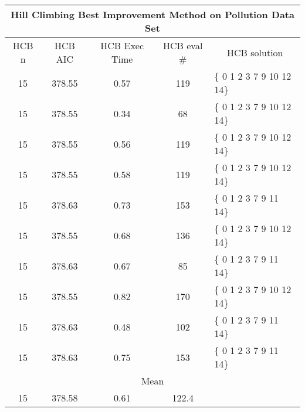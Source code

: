 \begin{tabular}{|c|c|c|c|l|}
	\hline
	\multicolumn{5}{|c|}{Hill Climbing Best Improvement Method on Pollution Data Set}                     \\ \hline
	HCB n & HCB AIC     & HCB Exec Time & HCB eval \# & \multicolumn{1}{c|}{HCB solution} \\ \hline
	15    & 378.55 & 0.57              & 119                    & \{ 0 1 2 3 7 9 10 12 14\}         \\ \hline
	15    & 378.55 & 0.34              & 68                     & \{ 0 1 2 3 7 9 10 12 14\}         \\ \hline
	15    & 378.55 & 0.56              & 119                    & \{ 0 1 2 3 7 9 10 12 14\}         \\ \hline
	15    & 378.55 & 0.58              & 119                    & \{ 0 1 2 3 7 9 10 12 14\}         \\ \hline
	15    & 378.63 & 0.73              & 153                    & \{ 0 1 2 3 7 9 11 14\}            \\ \hline
	15    & 378.55 & 0.68              & 136                    & \{ 0 1 2 3 7 9 10 12 14\}         \\ \hline
	15    & 378.63 & 0.67               & 85                     & \{ 0 1 2 3 7 9 11 14\}            \\ \hline
	15    & 378.55 & 0.82              & 170                    & \{ 0 1 2 3 7 9 10 12 14\}         \\ \hline
	15    & 378.63 & 0.48              & 102                    & \{ 0 1 2 3 7 9 11 14\}            \\ \hline
	15    & 378.63 & 0.75              & 153                    & \{ 0 1 2 3 7 9 11 14\}            \\ \hline
	\multicolumn{5}{|c|}{Mean}                                                                            \\ \hline
	15    & 378.58 & 0.61             & 122.4                  &                                   \\ \hline
\end{tabular}

